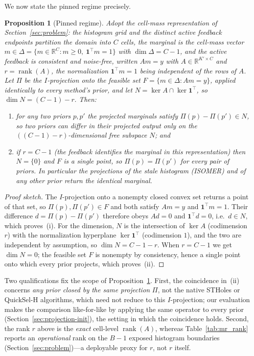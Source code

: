 \documentclass[preprint,12pt]{elsarticle}
\newtheorem{proposition}{Proposition}
\begin{document}
We now state the pinned regime precisely.

\begin{proposition}[Pinned regime]
\label{prop:pinned}
Adopt the cell-mass representation of Section~\ref{sec:problem}: the histogram grid and the
distinct active feedback endpoints partition the domain into $C$ cells, the marginal is the
cell-mass vector $m\in\Delta=\{m\in\mathbb{R}^{C}:m\ge 0,\ \mathbf{1}^\top m=1\}$ with
$\dim\Delta=C-1$, and the active feedback is \emph{consistent and noise-free}, written
$Am=y$ with $A\in\mathbb{R}^{K'\times C}$ and $r=\operatorname{rank}(A)$, the normalization
$\mathbf{1}^\top m=1$ being independent of the rows of $A$. Let $\Pi$ be the $I$-projection
onto the feasible set $F=\{m\in\Delta:Am=y\}$, applied identically to every method's prior,
and let $N=\ker A\cap\ker\mathbf{1}^\top$, so $\dim N=(C-1)-r$. Then:
\begin{enumerate}
  \item for any two priors $p,p'$ the projected marginals satisfy $\Pi(p)-\Pi(p')\in N$,
        so two priors can differ in their projected output \emph{only} on the
        $((C-1)-r)$-dimensional free subspace $N$; and
  \item if $r=C-1$ (the feedback identifies the marginal in this representation) then
        $N=\{0\}$ and $F$ is a single point, so $\Pi(p)=\Pi(p')$ for \emph{every} pair of
        priors. In particular the projections of the stale histogram (ISOMER) and of any
        other prior return the identical marginal.
\end{enumerate}
\end{proposition}

\begin{proof}[Proof sketch]
The $I$-projection onto a nonempty closed convex set returns a point of that set, so
$\Pi(p),\Pi(p')\in F$ and both satisfy $Am=y$ and $\mathbf{1}^\top m=1$. Their difference
$d=\Pi(p)-\Pi(p')$ therefore obeys $Ad=0$ and $\mathbf{1}^\top d=0$, i.e.\ $d\in N$, which
proves~(i). For the dimension, $N$ is the intersection of $\ker A$ (codimension $r$) with
the normalization hyperplane $\ker\mathbf{1}^\top$ (codimension $1$), and the two are
independent by assumption, so $\dim N=C-1-r$. When $r=C-1$ we get $\dim N=0$; the feasible
set $F$ is nonempty by consistency, hence a single point onto which every prior projects,
which proves~(ii).
\end{proof}

Two qualifications fix the scope of Proposition~\ref{prop:pinned}. First, the coincidence
in~(ii) concerns \emph{any prior closed by the same projection} $\Pi$, not the native
STHoles or QuickSel-H algorithms, which need not reduce to this $I$-projection; our
evaluation makes the comparison like-for-like by applying the same operator to every prior
(Section~\ref{sec:projection-init}), the setting in which the coincidence holds. Second, the
rank $r$ above is the \emph{exact} cell-level $\operatorname{rank}(A)$, whereas
Table~\ref{tab:mr_rank} reports an \emph{operational} rank on the $B-1$ exposed histogram
boundaries (Section~\ref{sec:problem})---a deployable proxy for $r$, not $r$ itself.
\end{document}
